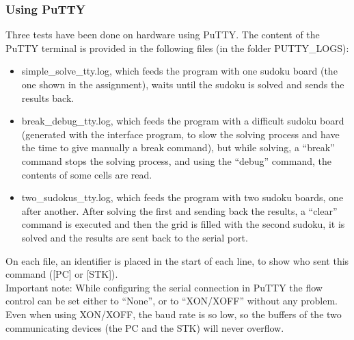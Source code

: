 \documentclass[12pt, a4, hidelinks]{article}
\begin{document}
\subsubsection*{Using PuTTY}
Three tests have been done on hardware using PuTTY. The content of the PuTTY terminal is provided in the following files (in the folder PUTTY\_LOGS):
\begin{itemize}
\item simple\_solve\_tty.log, which feeds the program with one sudoku board (the one shown in the assignment), waits until the sudoku is solved and sends the results back.
\item break\_debug\_tty.log, which feeds the program with a difficult sudoku board (generated with the interface program, to slow the solving process and have the time to give manually a break command), but while solving, a “break” command stops the solving process, and using the “debug” command, the contents of some cells are read.
\item two\_sudokus\_tty.log, which feeds the program with two sudoku boards, one after another. After solving the first and sending back the results, a “clear” command is executed and then the grid is filled with the second sudoku, it is solved and the results are sent back to the serial port.
\end{itemize}
On each file, an identifier is placed in the start of each line, to show who sent this command ([PC] or [STK]).\\
Important note: While configuring the serial connection in PuTTY the flow control can be set either to ``None'', or to ``XON/XOFF'' without any problem. Even when using XON/XOFF, the baud rate is so low, so the buffers of the two communicating devices (the PC and the STK) will never overflow.
\end{document}
